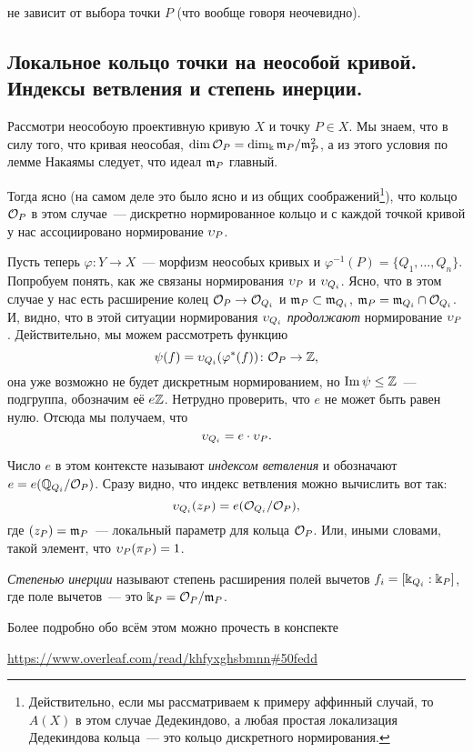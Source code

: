 	 не зависит от выбора точки $P$ (что вообще говоря неочевидно). 

  \subsection{Локальное кольцо точки на неособой кривой. Индексы ветвления и степень инерции. }

  Рассмотри неособоую проективную кривую $X$ и точку $P \in X$. Мы знаем, что в силу того, что кривая неособая, $\dim{\mathcal{O}_{P}} = \dim_{\Bbbk}\mathfrak{m}_{P}/\mathfrak{m}_{P}^2$, а из этого условия по лемме Накаямы следует, что идеал $\mathfrak{m}_{P}$ главный. 

  Тогда ясно (на самом деле это было ясно и из общих соображений\footnote{Действительно, если мы рассматриваем к примеру аффинный случай, то $A(X)$ в этом случае Дедекиндово, а любая простая локализация Дедекиндова кольца~--- это кольцо дискретного нормирования. }), что кольцо $\mathcal{O}_P$ в этом случае~--- дискретно нормированное кольцо и с каждой точкой кривой у нас ассоциировано нормирование $\upsilon_{P}$.

  Пусть теперь $\varphi\colon Y \to X$~--- морфизм неособых кривых и $\varphi^{-1}(P) = \{ Q_1, \ldots, Q_n \}$. Попробуем понять, как же связаны нормирования $\upsilon_{P}$ и $\upsilon_{Q_i}$. Ясно, что в этом случае у нас есть расширение  колец $\mathcal{O}_{P} \to \mathcal{O}_{Q_i}$ и $\mathfrak{m}_P \subset \mathfrak{m}_{Q_i}$, $\mathfrak{m}_{P} = \mathfrak{m}_{Q_i} \cap \mathcal{O}_{Q_i}$. И, видно, что в этой ситуации нормирования $\upsilon_{Q_i}$ \emph{продолжают} нормирование $\upsilon_{P}$. Действительно, мы можем рассмотреть функцию 
  \[ 
        \psi(f) = \upsilon_{Q_i}(\varphi^*(f)) \colon \mathcal{O}_{P} \to \mathbb{Z},
  \]
  она уже возможно не будет дискретным нормированием, но $\mathop{\mathrm{Im}}\nolimits{\psi} \le \mathbb{Z}$~--- подгруппа, обозначим её $e\mathbb{Z}$. Нетрудно проверить, что $e$ не может быть равен нулю.  Отсюда мы получаем, что 
  \[ 
        \upsilon_{Q_i} = e \cdot \upsilon_{P}.
  \]

  Число $e$ в этом контексте называют \emph{индексом ветвления} и обозначают $e = e(\mathbb{Q}_{Q_i}/\mathcal{O}_{P})$.  Сразу видно, что индекс ветвления можно вычислить вот так: 
  \[ 
        \upsilon_{Q_i}(z_P) = e(\mathcal{O}_{Q_i}/\mathcal{O}_{P}),
  \]
  где $(z_P) = \mathfrak{m}_P$~--- локальный параметр для кольца $\mathcal{O}_{P}$. Или, иными словами, такой элемент, что $\upsilon_P(\pi_P) = 1$. 
  
  
  \emph{Степенью инерции} называют степень расширения полей вычетов $f_i = [\Bbbk_{Q_i} : \Bbbk_{P}]$, где поле вычетов~--- это $\Bbbk_{P} = \mathcal{O}_P/\mathfrak{m}_P$. 
  
  \begin{remark}
    Более подробно обо всём этом можно прочесть в конспекте 
    \begin{center}
     \url{https://www.overleaf.com/read/khfyxghsbmnn#50fedd}
    \end{center}
  \end{remark}

